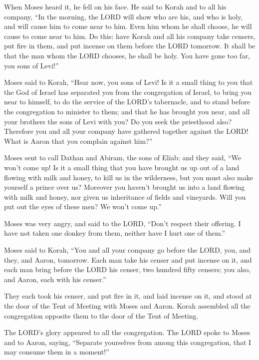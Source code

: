 \myverse{}When Moses heard it, he fell on his face.
\myverse{}He said to Korah and to all his company, “In the morning, the LORD will show
who are his, and who is holy, and will cause him to come near to him. Even him whom he shall choose, he
will cause to come near to him.
\myverse{}Do this: have Korah and all his company take censers,
\myverse{}put fire in them, and put incense on them before the LORD tomorrow. It shall
be that the man whom the LORD chooses, he shall be holy. You have gone too far, you sons of Levi!”


\myverse{}Moses said to Korah, “Hear now, you sons of Levi!
\myverse{}Is it a small thing to you that the God of Israel has separated you from the
congregation of Israel, to bring you near to himself, to do the service of the LORD’s tabernacle, and
to stand before the congregation to minister to them;
\myverse{}and that he has brought you near, and all your brothers the sons of Levi
with you? Do you seek the priesthood also?
\myverse{}Therefore you and all your company have gathered together against the LORD!
What is Aaron that you complain against him?”


\myverse{}Moses sent to call Dathan and Abiram, the sons of Eliab; and
they said, “We won’t come up!
\myverse{}Is it a small thing that you have brought us up out of a land flowing with
milk and honey, to kill us in the wilderness, but you must also make yourself a prince over us?
\myverse{}Moreover you haven’t brought us into a land flowing with milk and honey,
nor given us inheritance of fields and vineyards. Will you put out the eyes of these men? We won’t come
up.”


\myverse{}Moses was very angry, and said to the LORD, “Don’t respect their
offering. I have not taken one donkey from them, neither have I hurt one of them.”


\myverse{}Moses said to Korah, “You and all your company go before the
LORD, you, and they, and Aaron, tomorrow.
\myverse{}Each man take his censer and put incense on it, and each man bring before
the LORD his censer, two hundred fifty censers; you also, and Aaron, each with his censer.”


\myverse{}They each took his censer, and put fire in it, and laid incense
on it, and stood at the door of the Tent of Meeting with Moses and Aaron.
\myverse{}Korah assembled all the congregation opposite them to the door of the Tent
of Meeting.

The LORD’s glory appeared to all the congregation.
\myverse{}The LORD spoke to Moses and to Aaron, saying,
\myverse{}“Separate yourselves from among this congregation, that I may consume them
in a moment!”


